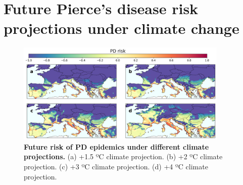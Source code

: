 \section{Future Pierce’s disease risk projections under climate change}

\begin{figure}[H]
    \centering
    \includegraphics[width=0.9\textwidth]{Figures/Future_risk_vector.pdf}
    \caption[Future risk of PD epidemics under different climate
        projections]{\textbf{Future risk of PD epidemics under different
            climate
            projections.} (a) +1.5 ºC climate projection. (b) +2 ºC climate
        projection. (c)
        +3 ºC climate projection. (d) +4 ºC climate projection.}
    \label{fig:PD_future_risk}
\end{figure}

\begin{table}[H]
    \centering
    \caption[Risk velocity statistics for each climate projection]{Some risk
        velocity statistics for each climate projection.}
    \label{tab:risk_vel}
\end{table}

